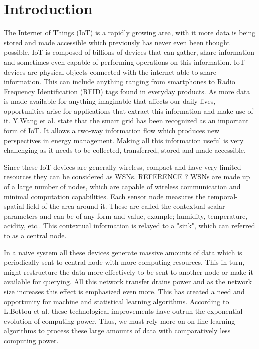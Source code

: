 \documentclass{mproj}
\begin{document}
\chapter{Introduction}\label{intro}
The Internet of Things (IoT) is a rapidly growing area, with it more data is being stored and made accessible which previously has never even been thought possible. IoT is composed of billions of devices that can gather, share information and sometimes even capable of performing operations on this information. IoT devices are physical objects connected with the internet able to share information. This can include anything ranging from smartphones to Radio Frequency Identification (RFID) tags found in everyday products. As more data is made available for anything imaginable that affects our daily lives, opportunities arise for applications that extract this information and make use of it. Y.Wang et al. \cite{distributedEnergyDistribution} state that the smart grid has been recognized as an important form of IoT. It allows a two-way information flow which produces new perspectives in energy management. Making all this information useful is very challenging as it needs to be collected, transferred, stored and made accessible. \cite{intelligentContextualInformation} 

Since these IoT devices are generally wireless, compact and have very limited resources they can be considered as WSNs. REFERENCE ? WSNs are made up of a large number of nodes, which are capable of wireless communication and minimal computation capabilities. \cite{adaptiveDataForwarding} Each sensor node measures the temporal-spatial field of the area around it. These are called the contextual scalar parameters and can be of any form and value, example; humidity, temperature, acidity, etc.. This contextual information is relayed to a "sink", which can referred to as a central node.

In a naive system all these devices generate massive amounts of data which is periodically sent to central node with more computing resources. This in turn, might restructure the data more effectively to be sent to another node or make it available for querying. All this network transfer drains power and as the network size increases this effect is emphasized even more. This has created a need and opportunity for machine and statistical learning algorithms.\cite{LargeScaleOnlineLearning} According to L.Bottou et al.\cite{LargeScaleOnlineLearning} these technological improvements have outrun the exponential evolution of computing power. Thus, we must rely more on on-line learning algorithms to process these large amounts of data with comparatively less computing power.
\end{document}
